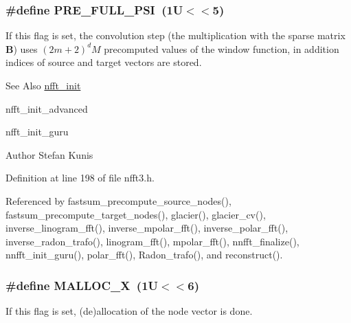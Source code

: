 \hypertarget{group__nfft_ga7ad8a7e19519b16340dabec48899c6a4}{
\subsubsection[{P\-R\-E\-\_\-\-F\-U\-L\-L\-\_\-\-P\-S\-I}]{\setlength{\rightskip}{0pt plus 5cm}\#define P\-R\-E\-\_\-\-F\-U\-L\-L\-\_\-\-P\-S\-I~(1\-U$<$$<$5)}}\label{group__nfft_ga7ad8a7e19519b16340dabec48899c6a4}
If this flag is set, the convolution step (the multiplication with the sparse matrix $\mathbf{B}$) uses $(2m+2)^dM$ precomputed values of the window function, in addition indices of source and target vectors are stored.

\begin{DoxySeeAlso}{See Also}
\hyperlink{group__nfft_ga1dfeaf18f3735f035afa62ca768d99c4}{nfft\-\_\-init} 

nfft\-\_\-init\-\_\-advanced 

nfft\-\_\-init\-\_\-guru 
\end{DoxySeeAlso}
\begin{DoxyAuthor}{Author}
Stefan Kunis 
\end{DoxyAuthor}


Definition at line 198 of file nfft3.\-h.



Referenced by fastsum\-\_\-precompute\-\_\-source\-\_\-nodes(), fastsum\-\_\-precompute\-\_\-target\-\_\-nodes(), glacier(), glacier\-\_\-cv(), inverse\-\_\-linogram\-\_\-fft(), inverse\-\_\-mpolar\-\_\-fft(), inverse\-\_\-polar\-\_\-fft(), inverse\-\_\-radon\-\_\-trafo(), linogram\-\_\-fft(), mpolar\-\_\-fft(), nnfft\-\_\-finalize(), nnfft\-\_\-init\-\_\-guru(), polar\-\_\-fft(), Radon\-\_\-trafo(), and reconstruct().

\hypertarget{group__nfft_ga353185384f87de0dc4320a82652ef724}{
\subsubsection[{M\-A\-L\-L\-O\-C\-\_\-\-X}]{\setlength{\rightskip}{0pt plus 5cm}\#define M\-A\-L\-L\-O\-C\-\_\-\-X~(1\-U$<$$<$6)}}\label{group__nfft_ga353185384f87de0dc4320a82652ef724}
If this flag is set, (de)allocation of the node vector is done.

